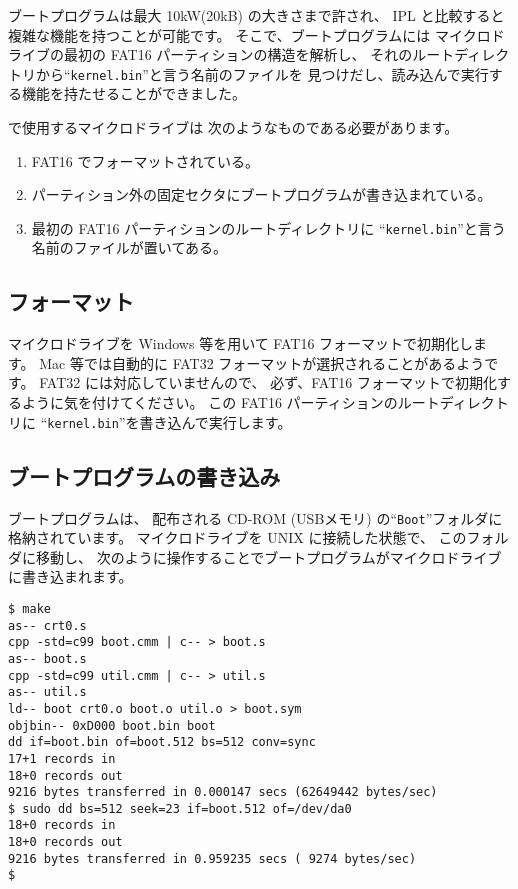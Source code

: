 ブートプログラムは最大 10kW(20kB) の大きさまで許され、
IPL と比較すると複雑な機能を持つことが可能です。
そこで、ブートプログラムには
マイクロドライブの最初の FAT16 パーティションの構造を解析し、
それのルートディレクトリから``\verb/kernel.bin/''と言う名前のファイルを
見つけだし、読み込んで実行する機能を持たせることができました。

\tac で使用するマイクロドライブは 次のようなものである必要があります。

\begin{enumerate}
\item FAT16 でフォーマットされている。
\item パーティション外の固定セクタにブートプログラムが書き込まれている。
\item 最初の FAT16 パーティションのルートディレクトリに
``\verb/kernel.bin/''と言う名前のファイルが置いてある。
\end{enumerate}

\subsection{フォーマット}

マイクロドライブを Windows 等を用いて FAT16 フォーマットで初期化します。
Mac 等では自動的に FAT32 フォーマットが選択されることがあるようです。
FAT32 には対応していませんので、
必ず、FAT16 フォーマットで初期化するように気を付けてください。
この FAT16 パーティションのルートディレクトリに
``\verb/kernel.bin/''を書き込んで実行します。

\subsection{ブートプログラムの書き込み}

ブートプログラムは、
配布される CD-ROM (USBメモリ) の``{\tt Boot}''フォルダに
格納されています。
マイクロドライブを UNIX に接続した状態で、
このフォルダに移動し、
次のように操作することでブートプログラムがマイクロドライブに書き込まれます。

\begin{mylist}
\begin{verbatim}
$ make
as-- crt0.s
cpp -std=c99 boot.cmm | c-- > boot.s
as-- boot.s
cpp -std=c99 util.cmm | c-- > util.s
as-- util.s
ld-- boot crt0.o boot.o util.o > boot.sym
objbin-- 0xD000 boot.bin boot
dd if=boot.bin of=boot.512 bs=512 conv=sync
17+1 records in
18+0 records out
9216 bytes transferred in 0.000147 secs (62649442 bytes/sec)
$ sudo dd bs=512 seek=23 if=boot.512 of=/dev/da0
18+0 records in
18+0 records out
9216 bytes transferred in 0.959235 secs ( 9274 bytes/sec)
$
\end{verbatim}
\end{mylist}

